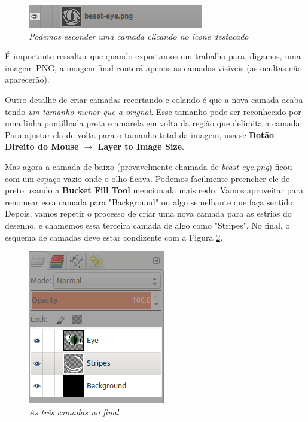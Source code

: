 \documentclass[12pt,onecolumn]{article}
\begin{document}
    \begin{figure}[H]
      \centering
      \includegraphics[width=.5\textwidth]{screenshots/06-hide_layer.png}
      \caption{
        \footnotesize
        \it Podemos esconder uma camada clicando no ícone destacado
      }
      \label{fig:hide_layer}
    \end{figure}
    
    \begin{framed}
      É importante ressaltar que quando exportamos um trabalho para, digamos,
      uma imagem PNG, a imagem final conterá apenas as camadas visíveis (as
      ocultas não aparecerão).
    \end{framed}
    
    Outro detalhe de criar camadas recortando e colando é que a nova camada
    acaba tendo {\it um tamanho menor que a orignal}. Esse tamanho pode ser
    reconhecido por uma linha pontilhada preta e amarela em volta da região que
    delimita a camada. Para ajustar ela de volta para o tamanho total da imagem,
    usa-se {\bf Botão Direito do Mouse $\rightarrow$ Layer to Image Size}.
    
    
    Mas agora a camada de baixo (provavelmente chamada de {\it beast-eye.png})
    ficou com um espaço vazio onde o olho ficava. Podemos facilmente preencher
    ele de preto usando a {\bf Bucket Fill Tool} mencionada mais cedo. Vamos
    aproveitar para renomear essa camada para "Background" ou algo semelhante
    que faça sentido. Depois, vamos repetir o processo de criar uma nova camada
    para as estrias do desenho, e chamemos essa terceira camada de algo como
    "Stripes". No final, o esquema de camadas deve estar condizente com a Figura
    \ref{fig:layers}.
    
    \begin{figure}[ht]
      \centering
      \includegraphics[width=.5\textwidth]{screenshots/07-layers.png}
      \caption{
        \footnotesize
        \it
        As três camadas no final
      }
      \label{fig:layers}
    \end{figure}
    
\end{document}
